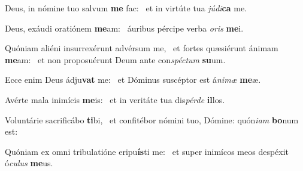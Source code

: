 \item Deus, in nómine tuo salvum \textbf{me} fac:~\psstar{} et in virtúte tua \textit{júdi}\textbf{ca} me.
\item Deus, exáudi oratiónem \textbf{me}am:~\psstar{} áuribus pércipe verba \textit{oris} \textbf{me}i.
\item Quóniam aliéni insurrexérunt advérsum me,~\pscross{} et fortes quæsiérunt ánimam \textbf{me}am:~\psstar{} et non proposuérunt Deum ante con\textit{spéctum} \textbf{su}um.
\item Ecce enim Deus ádju\textbf{vat} me:~\psstar{} et Dóminus suscéptor est á\textit{nimæ} \textbf{me}æ.
\item Avérte mala inimícis \textbf{me}is:~\psstar{} et in veritáte tua dis\textit{pérde} \textbf{il}los.
\item Voluntárie sacrificábo \textbf{ti}bi,~\psstar{} et confitébor nómini tuo, Dómine: quón\textit{iam} \textbf{bo}num est:
\item Quóniam ex omni tribulatióne eripu\textbf{ís}ti me:~\psstar{} et super inimícos meos despéxit ó\textit{culus} \textbf{me}us.
